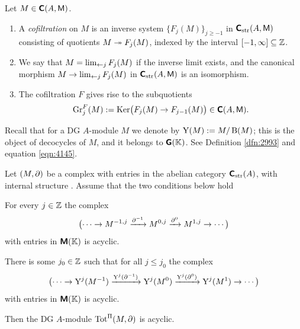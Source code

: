 \begin{dfn} \label{dfn:3336}
Let $M \in \boldsymbol{\mathsf{C}}(A, \operatorname{\mathsf{M}})$.
\begin{enumerate}
\item A {\em cofiltration}%
on $M$ is an inverse system
$\{ F_j(M) \}_{j \geq -1}$ in $\boldsymbol{\mathsf{C}}_{\mathrm{str}}(A, \operatorname{\mathsf{M}})$
consisting of quotients $M \twoheadrightarrow F_j(M)$, indexed by the interval 
$[-1, \infty] \subseteq \mathbb{Z}$. 

\item We say that $M = \lim_{\leftarrow j} F_j(M)$
if the inverse limit exists, and the 
canonical morphism $M \to \lim_{\leftarrow j} F_j(M)$
in $\boldsymbol{\mathsf{C}}_{\mathrm{str}}(A, \operatorname{\mathsf{M}})$ is an isomorphism.

\item The cofiltration $F$ gives rise to the subquotients 
\[ \operatorname{Gr}_j^F(M) := \operatorname{Ker} \bigl( F_j(M) \to F_{j - 1}(M) \bigr) 
\in \boldsymbol{\mathsf{C}}(A, \operatorname{\mathsf{M}}) . \]
\end{enumerate}
\end{dfn}

Recall that for a DG $A$-module $M$ we denote by 
$\operatorname{Y}(M) := M / \operatorname{B}(M)$; this is the object of decocycles of $M$, and 
it belongs to $\boldsymbol{\mathsf{G}}(\mathbb{K})$.
See Definition \ref{dfn:2993} and equation \ref{eqn:4145}. 

\begin{prop} \label{prop:3321}
Let $(M, \partial)$ be a complex with entries in the abelian category 
$\boldsymbol{\mathsf{C}}_{\mathrm{str}}(A)$, 
with internal structure \tup{(\ref{eqn:3305})}. Assume that the two conditions 
below hold\tup{:}
\begin{itemize}
 For every $j \in \mathbb{Z}$ the complex  
\[ \bigl( \cdots \to M^{-1, j} \xrightarrow{\partial^{-1}}
M^{0, j} \xrightarrow{\partial^{0}} M^{1, j} \to \cdots \bigr) \]
with entries in $\boldsymbol{\mathsf{M}}(\mathbb{K})$ is acyclic. 

 There is some $j_0 \in \mathbb{Z}$ such that for all 
$j \leq j_0$ the complex 
\[ \bigl( \cdots \to \operatorname{Y}^j(M^{-1}) \xrightarrow{\operatorname{Y}^j(\partial^{-1})}
\operatorname{Y}^j(M^{0}) \xrightarrow{\operatorname{Y}^j(\partial^{0})} \operatorname{Y}^j(M^{1}) \to \cdots \bigr) \]
with entries in $\boldsymbol{\mathsf{M}}(\mathbb{K})$ is acyclic. 
\end{itemize}
Then the DG $A$-module $\operatorname{Tot}^{\Pi}(M, \partial)$ is acyclic. 
\end{prop}

